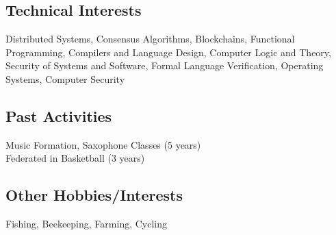 \documentclass[a4paper,12pt]{article}
\begin{document}


\vspace*{10pt}
\subsection{Technical Interests}
Distributed Systems, Consensus Algorithms, Blockchains, Functional Programming, Compilers and Language Design, Computer Logic and Theory, Security of Systems and Software, Formal Language Verification, Operating Systems, Computer Security

\vspace*{6pt}
\subsection{Past Activities}
Music Formation, Saxophone Classes (5 years)\\
Federated in Basketball (3 years)


\vspace*{6pt}
\subsection{Other Hobbies/Interests}
Fishing, Beekeeping, Farming, Cycling
\end{document}
